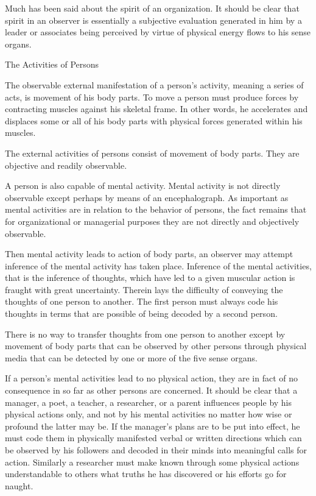 Much has been said about the spirit of an organization. It should be clear that spirit in an observer is essentially a subjective evaluation generated in him by a leader or associates being perceived by virtue of physical energy flows to his sense organs.

The Activities of Persons

The observable external manifestation of a person’s activity, meaning a series of acts, is movement of his body parts. To move a person must produce forces by contracting muscles against his skeletal frame. In other words, he accelerates and displaces some or all of his body parts with physical forces generated within his muscles.

The external activities of persons consist of movement of body parts. They are objective and readily observable.

A person is also capable of mental activity. Mental activity is not directly observable except perhaps by means of an encephalograph. As important as mental activities are in relation to the behavior of persons, the fact remains that for organizational or managerial purposes they are not directly and objectively observable.

Then mental activity leads to action of body parts, an observer may attempt inference of the mental activity has taken place. Inference of the mental activities, that is the inference of thoughts, which have led to a given muscular action is fraught with great uncertainty. Therein lays the difficulty of conveying the thoughts of one person to another. The first person must always code his thoughts in terms that are possible of being decoded by a second person.

There is no way to transfer thoughts from one person to another except by movement of body parts that can be observed by other persons through physical media that can be detected by one or more of the five sense organs.

If a person’s mental activities lead to no physical action, they are in fact of no consequence in so far as other persons are concerned. It should be clear that a manager, a poet, a teacher, a researcher, or a parent influences people by his physical actions only, and not by his mental activities no matter how wise or profound the latter may be. If the manager’s plans are to be put into effect, he must code them in physically manifested verbal or written directions which can be observed by his followers and decoded in their minds into meaningful calls for action. Similarly a researcher must make known through some physical actions understandable to others what truths he has discovered or his efforts go for naught.


